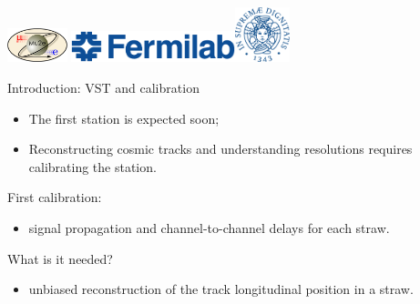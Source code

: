 \documentclass{beamer}[10pt]
\begin{document}
\begin{frame}
\centering
\includegraphics[height=1cm]{figures/png/mu2e_logo_oval.png}
\titlepage
\centering
\includegraphics[height=0.9cm]{figures/png/FNAL-Logo-NAL-Blue.png}\hspace{10mm}\includegraphics[height=1.6cm]{figures/pdf/cherubino.pdf}

\end{frame}
\begin{frame}{Introduction: VST and calibration}
  \begin{itemize}
  \item The first station is expected soon;
  \vspace{1mm}
  \item Reconstructing cosmic tracks and understanding resolutions requires calibrating the station.
  \end{itemize}
  \vspace{3mm}
 First calibration:
 \vspace{1mm}
  \begin{itemize}
    \item signal propagation and channel-to-channel delays for each straw.
  \end{itemize}
  \vspace{3mm}
  What is it needed?
  \vspace{1mm}
  \begin{itemize}
    \item unbiased reconstruction of the track longitudinal position in a straw.
  \end{itemize}
 
\end{frame}
\end{document}
